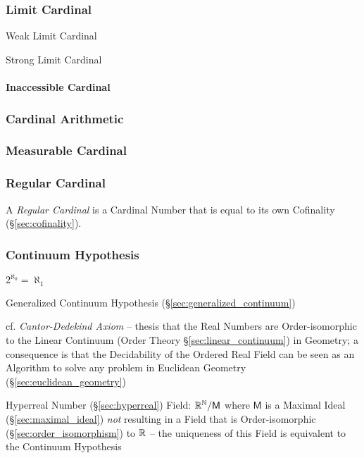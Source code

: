 \subsubsection{Limit Cardinal}\label{sec:limit_cardinal}

Weak Limit Cardinal

Strong Limit Cardinal



\paragraph{Inaccessible Cardinal}\label{sec:inaccessible_cardinal}\hfill



\subsubsection{Cardinal Arithmetic}\label{sec:cardinal_arithmetic}

\subsubsection{Measurable Cardinal}\label{sec:measurable_cardinal}

\subsubsection{Regular Cardinal}\label{sec:regular_cardinal}

A \emph{Regular Cardinal} is a Cardinal Number that is equal to its
own Cofinality (\S\ref{sec:cofinality}).



\subsubsection{Continuum Hypothesis}\label{sec:continuum_hypothesis}

$2^{\aleph_0} = \aleph_1$

Generalized Continuum Hypothesis (\S\ref{sec:generalized_continuum})

cf. \emph{Cantor-Dedekind Axiom} -- thesis that the Real Numbers are
Order-isomorphic to the Linear Continuum (Order Theory
\S\ref{sec:linear_continuum}) in Geometry; a consequence is that the
Decidability of the Ordered Real Field can be seen as an Algorithm to solve any
problem in Euclidean Geometry (\S\ref{sec:euclidean_geometry})

Hyperreal Number (\S\ref{sec:hyperreal}) Field: $\mathbb{R}^{\mathbb{N}} /
\mathsf{M}$ where $\mathsf{M}$ is a Maximal Ideal
(\S\ref{sec:maximal_ideal}) \emph{not} resulting in a Field that is
Order-isomorphic (\S\ref{sec:order_isomorphism}) to $\mathbb{R}$ -- the
uniqueness of this Field is equivalent to the Continuum Hypothesis



